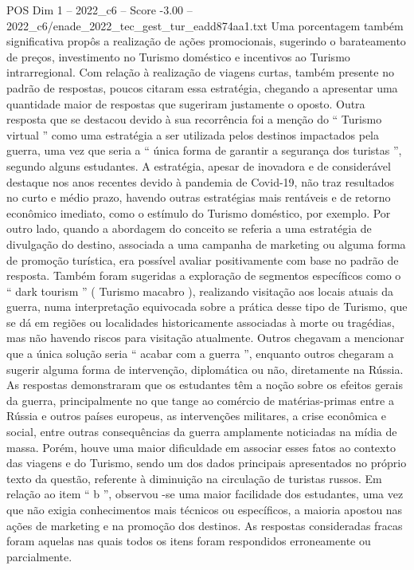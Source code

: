 \begin{textsample}{POS Dim 1 – 2022\_c6 – Score -3.00 – 2022\_c6/enade\_2022\_tec\_gest\_tur\_eadd874aa1.txt}
Uma porcentagem também significativa propôs a realização de ações promocionais, sugerindo o barateamento de preços, investimento no Turismo doméstico e incentivos ao Turismo intrarregional.
Com relação à realização de viagens curtas, também presente no padrão de respostas, poucos citaram essa estratégia, chegando a apresentar uma quantidade maior de respostas que sugeriram justamente o oposto.
Outra resposta que se destacou devido à sua recorrência foi a menção do “ Turismo virtual ” como uma estratégia a ser utilizada pelos destinos impactados pela guerra, uma vez que seria a “ única forma de garantir a segurança dos turistas ”, segundo alguns estudantes.
A estratégia, apesar de inovadora e de considerável destaque nos anos recentes devido à pandemia de Covid-19, não traz resultados no curto e médio prazo, havendo outras estratégias mais rentáveis e de retorno econômico imediato, como o estímulo do Turismo doméstico, por exemplo.
Por outro lado, quando a abordagem do conceito se referia a uma estratégia de divulgação do destino, associada a uma campanha de marketing ou alguma forma de promoção turística, era possível avaliar positivamente com base no padrão de resposta.
Também foram sugeridas a exploração de segmentos específicos como o “ dark tourism ” ( Turismo macabro ), realizando visitação aos locais atuais da guerra, numa interpretação equivocada sobre a prática desse tipo de Turismo, que se dá em regiões ou localidades historicamente associadas à morte ou tragédias, mas não havendo riscos para visitação atualmente.
Outros chegavam a mencionar que a única solução seria “ acabar com a guerra ”, enquanto outros chegaram a sugerir alguma forma de intervenção, diplomática ou não, diretamente na Rússia.
As respostas demonstraram que os estudantes têm a noção sobre os efeitos gerais da guerra, principalmente no que tange ao comércio de matérias-primas entre a Rússia e outros países europeus, as intervenções militares, a crise econômica e social, entre outras consequências da guerra amplamente noticiadas na mídia de massa.
Porém, houve uma maior dificuldade em associar esses fatos ao contexto das viagens e do Turismo, sendo um dos dados principais apresentados no próprio texto da questão, referente à diminuição na circulação de turistas russos.
Em relação ao item “ b ”, observou -se uma maior facilidade dos estudantes, uma vez que não exigia conhecimentos mais técnicos ou específicos, a maioria apostou nas ações de marketing e na promoção dos destinos.
As respostas consideradas fracas foram aquelas nas quais todos os itens foram respondidos erroneamente ou parcialmente.

\end{textsample}

